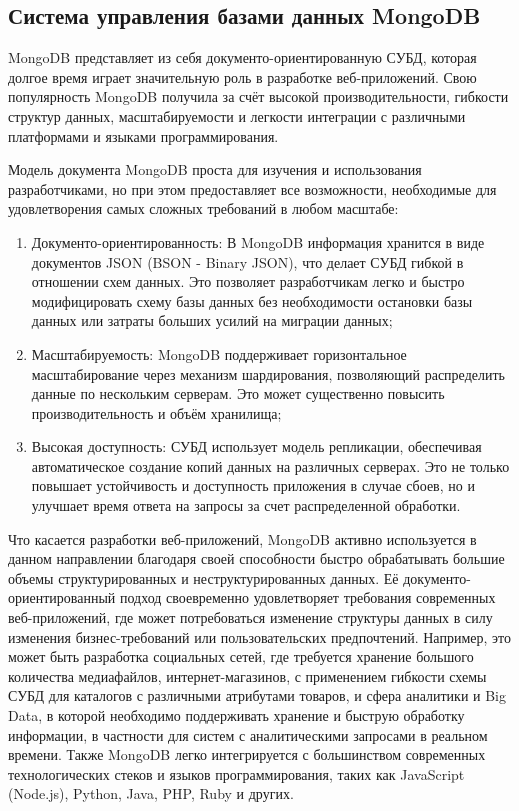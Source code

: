 \documentclass[master, och, diploma]{SCWorks}
\begin{document}
\subsection{Система управления базами данных MongoDB}
MongoDB представляет из себя документо-ориентированную СУБД, которая долгое время играет значительную роль в разработке веб-приложений. Свою популярность MongoDB получила за счёт высокой производительности, гибкости структур данных, масштабируемости и легкости интеграции с различными платформами и языками программирования.

Модель документа MongoDB проста для изучения и использования разработчиками, но при этом предоставляет все возможности, необходимые для удовлетворения самых сложных требований в любом масштабе:
\begin{enumerate}
    \item Документо-ориентированность: В MongoDB информация хранится в виде документов JSON (BSON - Binary JSON), что делает СУБД гибкой в отношении схем данных. Это позволяет разработчикам легко и быстро модифицировать схему базы данных без необходимости остановки базы данных или затраты больших усилий на миграции данных;
    \item Масштабируемость: MongoDB поддерживает горизонтальное масштабирование через механизм шардирования, позволяющий распределить данные по нескольким серверам. Это может существенно повысить производительность и объём хранилища;
    \item Высокая доступность: СУБД использует модель репликации, обеспечивая автоматическое создание копий данных на различных серверах. Это не только повышает устойчивость и доступность приложения в случае сбоев, но и улучшает время ответа на запросы за счет распределенной обработки\cite{mongodb_what}\cite{data_introduction}.
\end{enumerate}

Что касается разработки веб-приложений, MongoDB активно используется в данном направлении благодаря своей способности быстро обрабатывать большие объемы структурированных и неструктурированных данных. Её документо-ориентированный подход своевременно удовлетворяет требования современных веб-приложений, где может потребоваться изменение структуры данных в силу изменения бизнес-требований или пользовательских предпочтений. Например, это может быть разработка социальных сетей, где требуется хранение большого количества медиафайлов, интернет-магазинов, с применением гибкости схемы СУБД для каталогов с различными атрибутами товаров, и сфера аналитики и Big Data, в которой необходимо поддерживать хранение и быструю обработку информации, в частности для систем с аналитическими запросами в реальном времени. Также MongoDB легко интегрируется с большинством современных технологических стеков и языков программирования, таких как JavaScript (Node.js), Python, Java, PHP, Ruby и других\cite{mongodb_what}\cite{Cockoulin_2022}.
\end{document}
